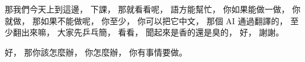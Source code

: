 \hypertarget{w02:cue:2877}{}那我們今天上到這邊，
\hypertarget{w02:cue:2878}{}下課，
\hypertarget{w02:cue:2879}{}那就看看呢，
\hypertarget{w02:cue:2880}{}語方能幫忙，
\hypertarget{w02:cue:2881}{}你如果能做一做，
\hypertarget{w02:cue:2882}{}你就做，
\hypertarget{w02:cue:2883}{}那如果不能做呢，
\hypertarget{w02:cue:2884}{}你至少，
\hypertarget{w02:cue:2885}{}你可以把它中文，
\hypertarget{w02:cue:2886}{}那個 AI 通過翻譯的，
\hypertarget{w02:cue:2887}{}至少翻出來嘛，
\hypertarget{w02:cue:2888}{}大家先乒乓簡，
\hypertarget{w02:cue:2889}{}看看，
\hypertarget{w02:cue:2890}{}聞起來是香的還是臭的，
\hypertarget{w02:cue:2891}{}好，
\hypertarget{w02:cue:2892}{}謝謝。

\hypertarget{w02:cue:2893}{}好，
\hypertarget{w02:cue:2894}{}那你該怎麼辦，
\hypertarget{w02:cue:2895}{}你怎麼辦，
\hypertarget{w02:cue:2896}{}你有事情要做。

